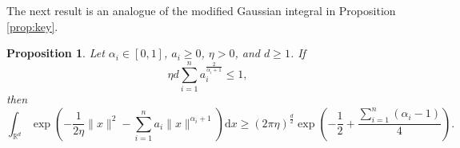 \documentclass[11pt,letterpaper]{article}
\newtheorem{proposition}[thm]{Proposition}
\newcommand{\R}{\mathbb{R}}
\newcommand{\inner}[2]{\langle #1,#2\rangle}
\newcommand{\tx}{\tilde x}
\newcommand{\rd}{\mathrm{d}}
\begin{document}

The next result is an analogue of the modified Gaussian integral in Proposition \ref{prop:key}.

\begin{proposition}\label{prop:key-new}
Let $\alpha_i\in[0,1]$, $a_i\ge 0$, $\eta>0$, and $d\ge 1$. If 
\begin{equation}\label{eq:aeta-new}
        \eta d \sum_{i=1}^n a_i^{\frac{2}{\alpha_i+1}} \le 1,
    \end{equation}
then
\begin{equation}\label{ineq:int-new}
    \int_{\R^d} \exp\left(-\frac{1}{2\eta}\|x\|^2 - \sum_{i=1}^n a_i\|x\|^{\alpha_i+1}\right) \rd x
\ge (2\pi \eta )^{\frac d2} \exp \left( -\frac12 + \frac{\sum_{i=1}^n (\alpha_i-1)}{4}\right).
\end{equation}
\end{proposition}
\end{document}
